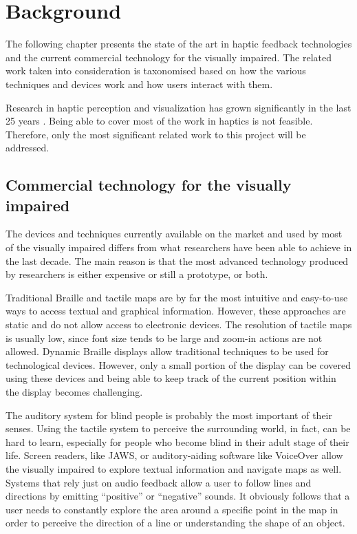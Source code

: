 \chapter{Background}

The following chapter presents the state of the art in haptic feedback technologies and the current commercial technology for the visually impaired. The related work taken into consideration is taxonomised based on how the various techniques and devices work and how users interact with them.

Research in haptic perception and visualization has grown significantly in the last 25 years \cite{roberts2007we}. Being able to cover most of the work in haptics is not feasible. Therefore, only the most significant related work to this project will be addressed.

\section{Commercial technology for the visually impaired}
The devices and techniques currently available on the market and used by most of the visually impaired differs from what researchers have been able to achieve in the last decade. The main reason is that the most advanced technology produced by researchers is either expensive or still a prototype, or both. 

Traditional Braille and tactile maps are by far the most intuitive and easy-to-use ways to access textual and graphical information. However, these approaches are static and do not allow access to electronic devices. The resolution of tactile maps is usually low, since font size tends to be large and zoom-in actions are not allowed. Dynamic Braille displays \cite{HumanWare, shimada2010development, blindMaps} allow traditional techniques to be used for technological devices. However, only a small portion of the display can be covered using these devices and being able to keep track of the current position within the display becomes challenging.

The auditory system for blind people is probably the most important of their senses. Using the tactile system to perceive the surrounding world, in fact, can be hard to learn, especially for people who become blind in their adult stage of their life. Screen readers, like JAWS, or auditory-aiding software like VoiceOver\cite{voiceOver} allow the visually impaired to explore textual information and navigate maps as well. Systems that rely just on audio feedback allow a user to follow lines and directions by emitting ``positive'' or ``negative'' sounds. It obviously follows that a user needs to constantly explore the area around a specific point in the map in order to perceive the direction of a line or understanding the shape of an object.    
    
